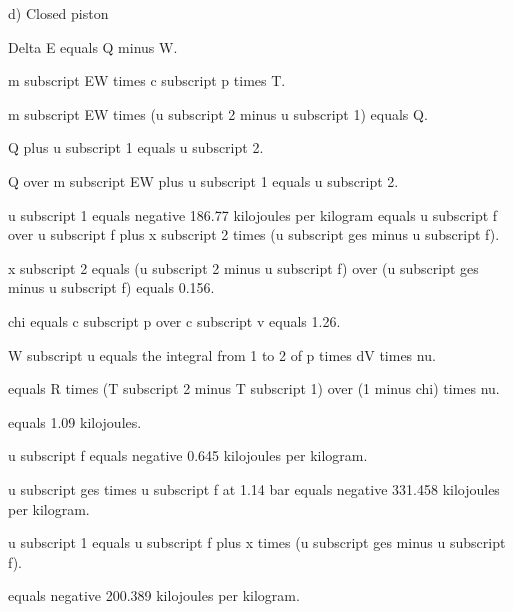 d) Closed piston

Delta E equals Q minus W.

m subscript EW times c subscript p times T.

m subscript EW times (u subscript 2 minus u subscript 1) equals Q.

Q plus u subscript 1 equals u subscript 2.

Q over m subscript EW plus u subscript 1 equals u subscript 2.

u subscript 1 equals negative 186.77 kilojoules per kilogram equals u subscript f over u subscript f plus x subscript 2 times (u subscript ges minus u subscript f).

x subscript 2 equals (u subscript 2 minus u subscript f) over (u subscript ges minus u subscript f) equals 0.156.

chi equals c subscript p over c subscript v equals 1.26.

W subscript u equals the integral from 1 to 2 of p times dV times nu.

equals R times (T subscript 2 minus T subscript 1) over (1 minus chi) times nu.

equals 1.09 kilojoules.

u subscript f equals negative 0.645 kilojoules per kilogram.

u subscript ges times u subscript f at 1.14 bar equals negative 331.458 kilojoules per kilogram.

u subscript 1 equals u subscript f plus x times (u subscript ges minus u subscript f).

equals negative 200.389 kilojoules per kilogram.